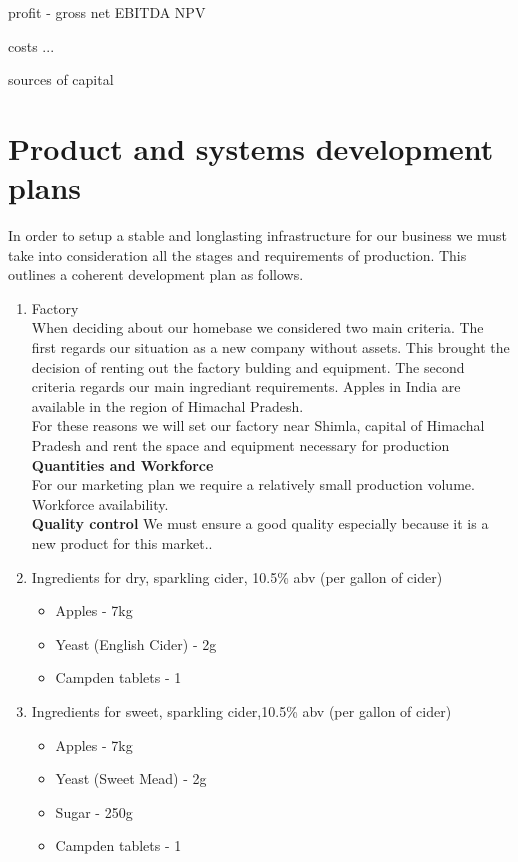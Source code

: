 \documentclass{article}
\begin{document}
profit
 - gross
   net
   EBITDA
   NPV

costs
 ...

sources of capital
\section{Product and systems development plans}
In order to setup a stable and longlasting infrastructure for our business we must take into consideration all the stages and requirements of production. This outlines a coherent development plan as follows.

	\begin{enumerate}
	\item Factory \\
When deciding about our homebase we considered two main criteria. The first regards our situation as a new company without assets. This brought the decision of renting out the factory bulding and equipment. The second criteria regards our main ingrediant requirements. Apples in India are available in the region of Himachal Pradesh. \\

For these reasons we will set our factory near Shimla, capital of Himachal Pradesh and rent the space and equipment necessary for production \\

\textbf{Quantities and Workforce} \\
For our marketing plan we require a relatively small production volume.\\
Workforce availability. \\

\textbf{Quality control}
We must ensure a good quality especially because it is a new product for this market..

	\item Ingredients for dry, sparkling cider, 10.5\% abv (per gallon of cider)
		\begin{itemize}
			\item Apples - 7kg
			\item Yeast (English Cider) - 2g
			\item Campden tablets - 1
		\end{itemize}

	\item Ingredients for sweet, sparkling cider,10.5\% abv (per gallon of cider)
		\begin{itemize}
			\item Apples - 7kg
			\item Yeast (Sweet Mead) - 2g
			\item Sugar - 250g
			\item Campden tablets - 1
		\end{itemize}


\end{enumerate}
\end{document}
